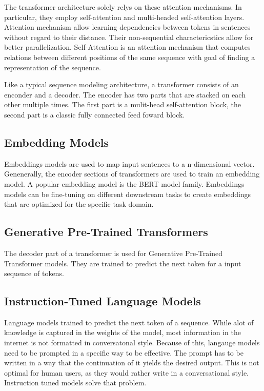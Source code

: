 \documentclass[english, version-2022-01]{uzl-thesis}
\begin{document}
The transformer architecture \cite{Vaswani2017} solely relys on these attention mechanisms.
In particular, they employ self-attention and multi-headed self-attention layers.
Attention mechanism allow learning dependencies between tokens in sentences without regard to their distance.
Their non-sequential charactericstics allow for better parallelization.
Self-Attention is an attention mechanism that computes relations between different positions of the same sequence with goal of finding a representation of the sequence.

Like a typical sequence modeling architecture, a transformer consists of an enconder and a decoder. The encoder has two parts that are stacked on each other multiple times. The first part is a mulit-head self-attention block, the second part is a classic fully connected feed foward block.

\subsection{Embedding Models}

Embeddings models are used to map input sentences to a n-dimensional vector.
Genenerally, the encoder sections of transformers are used to train an embedding model. 
A popular embedding model is the BERT model family. 
Embeddings models can be fine-tuning on different downstream tasks to create embeddings that are optimized for the specific task domain.

\subsection{Generative Pre-Trained Transformers}

The decoder part of a transformer is used for Generative Pre-Trained Transformer models.
They are trained to predict the next token for a input sequence of tokens.


 \subsection{Instruction-Tuned Language Models}

Language models trained to predict the next token of a sequence. While alot of knowledge is captured in the weights of the model, most information in the internet is not formatted in conversatonal style. Because of this, langauge models need to be prompted in a specific way to be effective. The prompt has to be written in a way that the continuation of it yields the desired output. This is not optimal for human users, as they would rather write in a conversational style. Instruction tuned models solve that problem.
\end{document}
